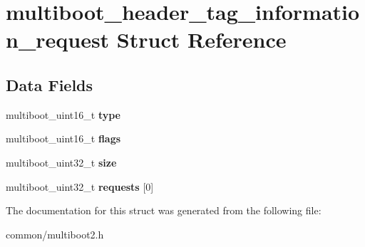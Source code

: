 \hypertarget{structmultiboot__header__tag__information__request}{}\section{multiboot\+\_\+header\+\_\+tag\+\_\+information\+\_\+request Struct Reference}
\label{structmultiboot__header__tag__information__request}
\subsection*{Data Fields}
\begin{DoxyCompactItemize}
\item 
multiboot\+\_\+uint16\+\_\+t {\bfseries type}\hypertarget{structmultiboot__header__tag__information__request_ad1934718be49dee844673635489f7295}{}\label{structmultiboot__header__tag__information__request_ad1934718be49dee844673635489f7295}

\item 
multiboot\+\_\+uint16\+\_\+t {\bfseries flags}\hypertarget{structmultiboot__header__tag__information__request_adb4920b7a10225b82879621b02373e9b}{}\label{structmultiboot__header__tag__information__request_adb4920b7a10225b82879621b02373e9b}

\item 
multiboot\+\_\+uint32\+\_\+t {\bfseries size}\hypertarget{structmultiboot__header__tag__information__request_a20a4f435f1e4700d2565ceae49609f10}{}\label{structmultiboot__header__tag__information__request_a20a4f435f1e4700d2565ceae49609f10}

\item 
multiboot\+\_\+uint32\+\_\+t {\bfseries requests} \mbox{[}0\mbox{]}\hypertarget{structmultiboot__header__tag__information__request_a8d5c56032a1b70f41a6b780fb18b3ac8}{}\label{structmultiboot__header__tag__information__request_a8d5c56032a1b70f41a6b780fb18b3ac8}

\end{DoxyCompactItemize}


The documentation for this struct was generated from the following file\+:\begin{DoxyCompactItemize}
\item 
common/multiboot2.\+h\end{DoxyCompactItemize}
